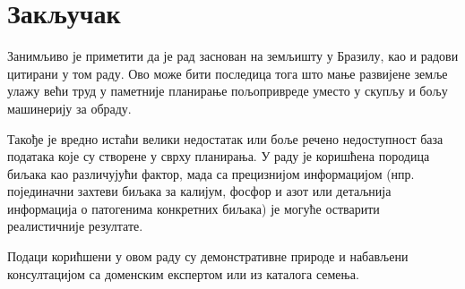 \documentclass[12pt,fleqn]{article}
\begin{document}
\section{Закључак}
Занимљиво је приметити да је рад \cite{geraldi} заснован на земљишту у Бразилу, као и радови цитирани у том раду. Ово може бити последица тога што мање развијене земље улажу већи труд у паметније планирање пољопривреде уместо у скупљу и бољу машинерију за обраду.

Такође је вредно истаћи велики недостатак или боље речено недоступност база података које су створене у сврху планирања. У раду је коришћена породица биљака као различујући фактор, мада са прецизнијом информацијом (нпр. појединачни захтеви биљака за калијум, фосфор и азот или детаљнија информација о патогенима конкретних биљака) је могуће остварити реалистичније резултате.

Подаци корићшени у овом раду су демонстративне природе и набављени консултацијом са доменским експертом или из каталога семења.

\printbibliography
\end{document}

